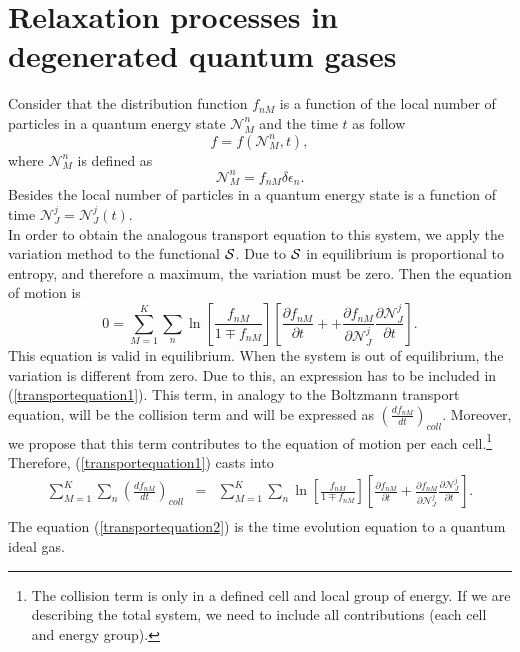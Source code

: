 
  \section{Relaxation processes in degenerated quantum gases}\label{sec:relaxproc}
Consider that the distribution function $f_{nM}$ is a function of the local number of particles in a quantum energy state $\mathcal{N}_{M}^{n}$ and the time $t$ as follow
\begin{equation}
    f=f(\mathcal{N}_M^{n},t),
\end{equation}
where $\mathcal{N}_{M}^{n}$ is defined as
\begin{equation}
    \mathcal{N}_{M}^{n}= f_{nM} \delta \epsilon_n.
\end{equation}
Besides the local number of particles in a quantum energy state 
is a function of time $\mathcal{N}_J^{j}=\mathcal{N}_J^{j}(t)$.\\
In order to obtain the analogous transport equation to this system, we apply the variation method to the functional $\mathcal{S}$. Due to $\mathcal{S}$ in equilibrium is proportional to entropy, and therefore a maximum, the variation must be zero. Then the equation of motion is
\begin{equation}
    0=\sum_{M=1}^{K} \sum_n \ln \left[ \frac{f_{nM}}{1\mp f_{nM}} \right] \left[ \frac{\partial f_{nM}}{\partial t}++\frac{\partial f_{nM}}{\partial \mathcal{N}_J^{j}} \frac{\partial \mathcal{N}_J^{j}}{\partial t} \right]. \label{transportequation1}
\end{equation}
This equation is valid in equilibrium. When the system is out of equilibrium, the variation is different from zero. Due to this, an expression has to be included in (\ref{transportequation1}). This term, in analogy to the Boltzmann transport equation, will be the collision term and will be expressed as $\left( \frac{df_{nM}}{dt} \right)_{coll}$. Moreover, we propose that this term contributes to the equation of motion per each cell.\footnote{The collision term is only in a defined cell and local group of energy. If we are describing the total system, we need to include all contributions (each cell and energy group).} Therefore, (\ref{transportequation1}) casts into
\begin{eqnarray}
    \sum_{M=1}^{K}\sum_n \left( \frac{df_{nM}}{dt} \right)_{coll}&=&\sum_{M=1}^{K} \sum_n \ln \left[ \frac{f_{nM}}{1\mp f_{nM}} \right] \left[ \frac{\partial f_{nM}}{\partial t}+\frac{\partial f_{nM}}{\partial \mathcal{N}_J^{j}} \frac{\partial \mathcal{N}_J^{j}}{\partial t} \right].  \nonumber \\ \label{transportequation2}
\end{eqnarray}
The equation (\ref{transportequation2}) is the time evolution equation to a quantum ideal gas. \\


  



